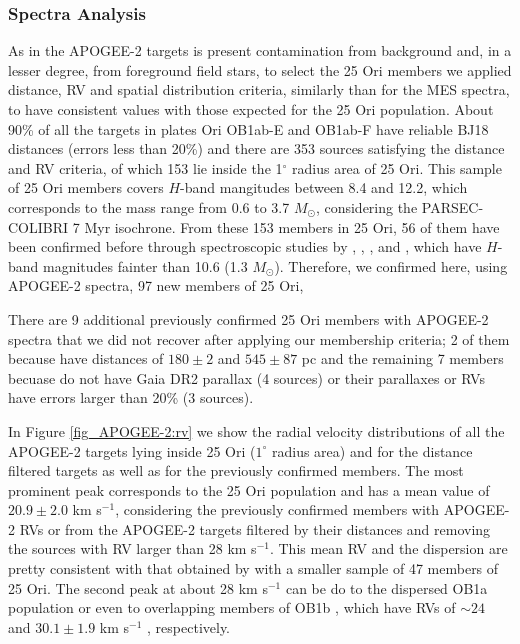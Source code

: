 \documentclass[12pt]{article}
\newcounter{subsubsubsection}[subsubsection]
\begin{document}
\subsubsection{Spectra Analysis}
\label{sec_APOGEE-2:analysis}

\label{sec_APOGEE-2:memberships}
As in the APOGEE-2 targets is present contamination from background and, in a lesser degree, from foreground field stars, to select the 25 Ori members we applied distance, RV and spatial distribution criteria, similarly than for the MES spectra, to have consistent values with those expected for the 25 Ori population. About 90\% of all the targets in plates Ori OB1ab-E and OB1ab-F have reliable BJ18 distances (errors less than 20\%) and there are 353 sources satisfying the distance and RV criteria, of which 153 lie inside the 1$^\circ$ radius area of 25 Ori. This sample of 25 Ori members covers $H$-band mangitudes between 8.4 and 12.2, which corresponds to the mass range from 0.6 to 3.7 $M_\odot$, considering the PARSEC-COLIBRI 7 Myr isochrone. From these 153 members in 25 Ori, 56 of them have been confirmed before through spectroscopic studies by \citet[18 sources; ][]{Briceno2005}, \citet[9 sources; ][]{Briceno2007}, \citet[8 sources; ][]{Downes2014}, \citet[3 sources; ][]{Suarez2017} and \citet[18 sources; ][]{Briceno2018}, which have $H$-band magnitudes fainter than 10.6 (1.3 $M_\odot$). Therefore, we confirmed here, using APOGEE-2 spectra, 97 new members of 25 Ori,%

There are 9 additional previously confirmed 25 Ori members with APOGEE-2 spectra that we did not recover after applying our membership criteria; 2 of them because have distances of $180\pm2$ and $545\pm87$ pc and the remaining 7 members becuase do not have Gaia DR2 parallax (4 sources) or their parallaxes or RVs have errors larger than 20\% (3 sources).

In Figure \ref{fig_APOGEE-2:rv} we show the radial velocity distributions of all the APOGEE-2 targets lying inside 25 Ori ($1^\circ$ radius area) and for the distance filtered targets as well as for the previously confirmed members. The most prominent peak corresponds to the 25 Ori population and has a mean value of $20.9\pm2.0$ km s$^{-1}$, considering the previously confirmed members with APOGEE-2 RVs or from the APOGEE-2 targets filtered by their distances and removing the sources with RV larger than 28 km s$^{-1}$. This mean RV and the dispersion are pretty consistent with that obtained by \citet[$19.7\pm1.7$ km s$^{-1}$; ][ and references therein]{Briceno2007} with a smaller sample of 47 members of 25 Ori. The second peak at about 28 km s$^{-1}$ can be do to the dispersed OB1a population or even to overlapping members of OB1b \citep[Orion C and D; ][]{Kounkel2018}, which have RVs of $\sim24$ \citep{Jeffries2006} and $30.1\pm1.9$ km s$^{-1}$ \citep{Briceno2007}, respectively.
\end{document}
